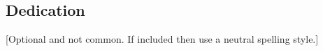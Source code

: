 \documentclass[Bachelorarbeit.tex]{subfiles}
\begin{document}
\begin{envLanguage}[english]
%
\chapter*{Dedication}
[Optional and not common. If included then use a neutral spelling style.]
%
\end{envLanguage}
\end{document}

